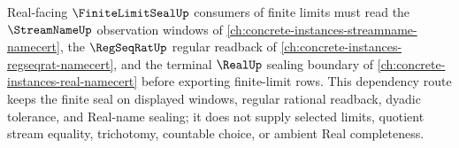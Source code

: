Real-facing $\FiniteLimitSealUp$ consumers of finite limits must read the $\StreamNameUp$ observation windows of \autoref{ch:concrete-instances-streamname-namecert}, the $\RegSeqRatUp$ regular readback of \autoref{ch:concrete-instances-regseqrat-namecert}, and the terminal $\RealUp$ sealing boundary of \autoref{ch:concrete-instances-real-namecert} before exporting finite-limit rows. This dependency route keeps the finite seal on displayed windows, regular rational readback, dyadic tolerance, and Real-name sealing; it does not supply selected limits, quotient stream equality, trichotomy, countable choice, or ambient Real completeness.
